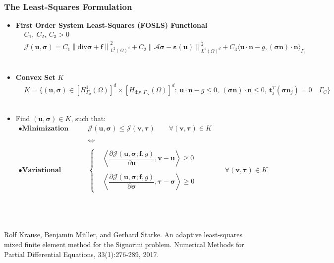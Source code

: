 \documentclass[8pt, oneside]{beamer}   	%
\newcommand{\bff}{\textbf{f}}
\newcommand{\bn}{\textbf{n}}
\newcommand{\btau}{\boldsymbol{\tau}}
\newcommand{\bt}{\textbf{t}}
\newcommand{\bv}{\textbf{v}}
\newcommand{\bu}{\textbf{u}}
\newcommand{\bsigma}{\boldsymbol{\sigma}}
\newcommand\norm[1]{\left\lVert#1\right\rVert}
\newcommand{\titlecolor}[1]{\frametitle{\textcolor{dkgrey}{ \textbf{#1}}}}
\begin{document}
\begin{frame}
\titlecolor{The Least-Squares Formulation}
\begin{itemize}
\item \textbf{First Order System Least-Squares (FOSLS) Functional}
\small
\begin{align*}
& C_1, \:C_2, \: C_3>0 \\
&\mathcal{J}(\bu,\bsigma)=C_{1} \norm{\text{div} \bsigma+\bff}_{L^2(\Omega)^d}^2+C_{2} \norm{\mathcal{A}\bsigma -\boldsymbol{\varepsilon}(\bu)}_{L^2(\Omega)^d}^2   +C_{3} \langle \bu \cdot \bn -g, (\bsigma \bn) \cdot \bn \rangle_{\Gamma_c}
\end{align*} 
${}$\\
\item  
\normalsize
\textbf{Convex Set} $K$
\small
\begin{align*}
& K=\{  \left(\bu,  \bsigma \right)  \in  \left[H_{\Gamma_{d}}^1(\Omega) \right]^d \times \left[ H_{\text{div},\Gamma_N}(\Omega) \right]^d    : \: 
 \bu \cdot \bn - g  \leq 0, \:  (\bsigma \bn) \cdot \bn \leq 0,  \: \bt_j^T(\bsigma \bn_j) =0 \quad  \Gamma_C
 \}
\end{align*}
${}$\\
\item \normalsize 
Find $(\bu,\bsigma) \in K$, such that:
\small
\begin{align*}
\bullet \textbf{Minimization problem:} \qquad  &{ \mathcal{J}(\bu,\bsigma) \leq \mathcal{J}(\bv,\btau ) \qquad \forall (\bv,\btau) \in K}\\\\
&\iff\\\\
\bullet \textbf{Variational Inequality:}\qquad &{
\begin{cases}
&
\left\langle \dfrac{\partial \mathcal{J}(\bu,\bsigma;\bff,g)}{\partial \bu }, \bv-\bu \right\rangle 
\geq 0 \\\\
&
\left\langle \dfrac{\partial \mathcal{J}(\bu,\bsigma;\bff,g)}{\partial \bsigma }, \btau-\bsigma \right\rangle 
\geq 0 
\end{cases}
\qquad \qquad
\forall (\bv, \btau) \in K}
\end{align*}
\end{itemize}
\normalsize
${}$\\
${}$\\${}$\\
\tiny{Rolf Krause, Benjamin M\"{u}ller, and Gerhard Starke. An adaptive least-squares mixed finite element method for the Signorini problem. Numerical Methods for Partial Differential Equations, 33(1):276-289, 2017.}
\end{frame}
\end{document}
